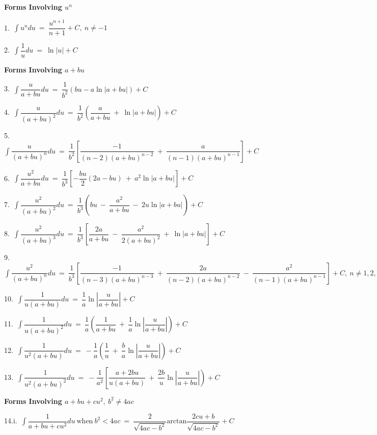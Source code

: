 \documentclass{article}
\begin{document}
\begin{large}
\begin{small}

\textbf{Forms Involving $u^{n}$}

1.\ $\displaystyle\int u^{n}du\ =\ \dfrac{u^{n+1}}{n+1} + C,\ n\neq-1$

2.\ $\displaystyle\int \dfrac{1}{u}du\ =\ \ln|u| + C$

\textbf{Forms Involving $a+bu$}

3.\ $\displaystyle\int \dfrac{u}{a+bu}du\ =\ \dfrac{1}{b^{2}}(bu-a\ln|a+bu|) + C$

4.\ $\displaystyle\int \dfrac{u}{(a+bu)^{2}}du\ =\ \dfrac{1}{b^{2}}\left(\dfrac{a}{a+bu}\ +\ \ln|a+bu|\right) + C$

5.\ $\displaystyle\int \dfrac{u}{(a+bu)^{n}}du\ =\ \dfrac{1}{b^{2}}\left[\dfrac{-1}{(n-2)(a+bu)^{n-2}}\ +\ \dfrac{a}{(n-1)(a+bu)^{n-1}}\right] + C$

6.\ $\displaystyle\int \dfrac{u^{2}}{a+bu}du\ =\ \dfrac{1}{b^{3}}\left[-\dfrac{bu}{2}(2a-bu)\ +\ a^{2}\ln|a+bu|\right] + C$

7.\ $\displaystyle\int \dfrac{u^{2}}{(a+bu)^{2}}du\ =\ \dfrac{1}{b^{3}}\left(bu\ -\ \dfrac{a^{2}}{a+bu}\ -\ 2u\ln|a+bu|\right) + C$

8.\ $\displaystyle\int \dfrac{u^{2}}{(a+bu)^{3}}du\ =\ \dfrac{1}{b^{3}}\left[\dfrac{2a}{a+bu}\ -\ \dfrac{a^{2}}{2(a+bu)^{2}}\ +\ \ln|a+bu|\right] + C$

9.\ $\displaystyle\int \dfrac{u^{2}}{(a+bu)^{n}}du\ =\ \dfrac{1}{b^{3}}\left[\dfrac{-1}{(n-3)(a+bu)^{n-3}}\ +\ \dfrac{2a}{(n-2)(a+bu)^{n-2}}\ -\ \dfrac{a^{2}}{(n-1)(a+bu)^{n-1}}\right] + C,\ n\neq 1, 2, 3$

10.\ $\displaystyle\int \dfrac{1}{u(a+bu)}du\ =\ \dfrac{1}{a}\ln\left|\dfrac{u}{a+bu}\right| + C$

11.\ $\displaystyle\int \dfrac{1}{u(a+bu)^{2}}du\ =\ \dfrac{1}{a}\left(\dfrac{1}{a+bu}\ +\ \dfrac{1}{a}\ln\left|\dfrac{u}{a+bu}\right|\right) + C$

12.\ $\displaystyle\int \dfrac{1}{u^{2}(a+bu)}du\ =\ -\dfrac{1}{a}\left(\dfrac{1}{u}\ +\ \dfrac{b}{a}\ln\left|\dfrac{u}{a+bu}\right|\right) + C$

13.\ $\displaystyle\int \dfrac{1}{u^{2}(a+bu)^{2}}du\ =\ -\dfrac{1}{a^{2}}\left[\dfrac{a+2bu}{u(a+bu)}\ +\ \dfrac{2b}{u}\ln\left|\dfrac{u}{a+bu}\right|\right) + C$

\textbf{Forms Involving $a+bu+cu^{2},\ b^{2}\neq 4ac$}

14.i.\ $\displaystyle\int \dfrac{1}{a+bu+cu^{2}}du\ \text{when}\ b^{2}<4ac\ =\ \dfrac{2}{\sqrt{4ac-b^{2}}}\text{arctan}\dfrac{2cu+b}{\sqrt{4ac-b^{2}}} + C$


\end{small}
\end{large}
\end{document}
